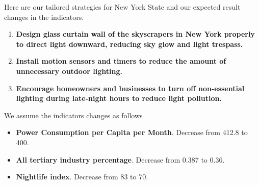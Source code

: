 Here are our tailored strategies for New York State and our expected result changes in the indicators.

\begin{enumerate}
    \item \textbf{Design glass curtain wall of the skyscrapers in New York properly to direct light downward, reducing sky glow and light trespass.} 

    \item \textbf{Install motion sensors and timers to reduce the amount of unnecessary outdoor lighting.}
    
    \item \textbf{Encourage homeowners and businesses to turn off non-essential lighting during late-night hours to reduce light pollution.}

\end{enumerate}

We assume the indicators changes as follows
\begin{itemize}
    \item \textbf{Power Consumption per Capita per Month}. Decrease from 412.8 to 400.
    \item \textbf{All tertiary industry percentage}. Decrease from 0.387 to 0.36.
    \item \textbf{Nightlife index}. Decrease from 83 to 70.
\end{itemize}